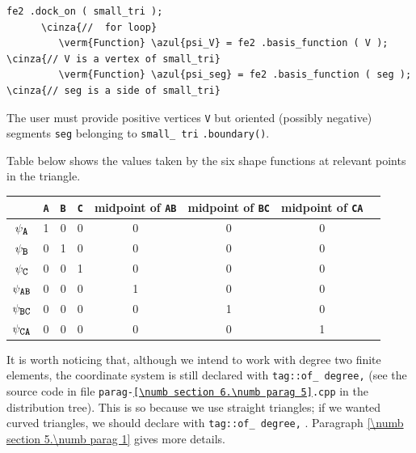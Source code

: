 \begin{Verbatim}[commandchars=\\\{\},formatcom=\small\tt,frame=single,
   label=parag-\ref{\numb section 6.\numb parag 5}.cpp,rulecolor=\color{moldura},
   baselinestretch=0.94,framesep=2mm                                            ]
      fe2 .dock_on ( small_tri );
      \cinza{//  for loop}  
         \verm{Function} \azul{psi_V} = fe2 .basis_function ( V );   \cinza{// V is a vertex of small_tri}
         \verm{Function} \azul{psi_seg} = fe2 .basis_function ( seg );  \cinza{// seg is a side of small_tri}
\end{Verbatim}

The user must provide positive vertices {\small\tt V} but oriented (possibly negative) segments
{\small\tt seg} belonging to {\small\tt small\_\,tri} {\small\tt .boundary()}.

Table below shows the values taken by the six shape functions at relevant points in the triangle.

\begin{center}\begin{tabular}{ | c | c | c | c | c | c | c | c | }
  \hline
  & {\small\tt A} & {\small\tt B} & {\small\tt C} & midpoint of {\small\tt AB} &
  midpoint of {\small\tt BC} & midpoint of {\small\tt CA}
  \\ \hline
  $ \psi_{\mbox{\small\tt A}} $ & 1 & 0 & 0 & 0 & 0 & 0
  \\ \hline
  $ \psi_{\mbox{\small\tt B}} $ & 0 & 1 & 0 & 0 & 0 & 0
  \\ \hline
  $ \psi_{\mbox{\small\tt C}} $ & 0 & 0 & 1 & 0 & 0 & 0
  \\ \hline
  $ \psi_{\mbox{\small\tt AB}} $ & 0 & 0 & 0 & 1 & 0 & 0
  \\ \hline
  $ \psi_{\mbox{\small\tt BC}} $ & 0 & 0 & 0 & 0 & 1 & 0
  \\ \hline
  $ \psi_{\mbox{\small\tt CA}} $ & 0 & 0 & 0 & 0 & 0 & 1
  \\ \hline
\end{tabular}\end{center}

It is worth noticing that, although we intend to work with degree two finite elements,
the coordinate system {\small\tt{}} is still declared with
{\small\tt\textcolor{tag}{tag}::of\_\,degree,} {\small\tt{}}
(see the source code in file {\small\tt parag-\ref{\numb section 6.\numb parag 5}.cpp}
in the distribution tree).
This is so because we use straight triangles; if we wanted curved triangles, we should
declare {\small\tt{}} with {\small\tt\textcolor{tag}{tag}::of\_\,degree,}
{\small\tt{}}.
Paragraph \ref{\numb section 5.\numb parag 1} gives more details.


